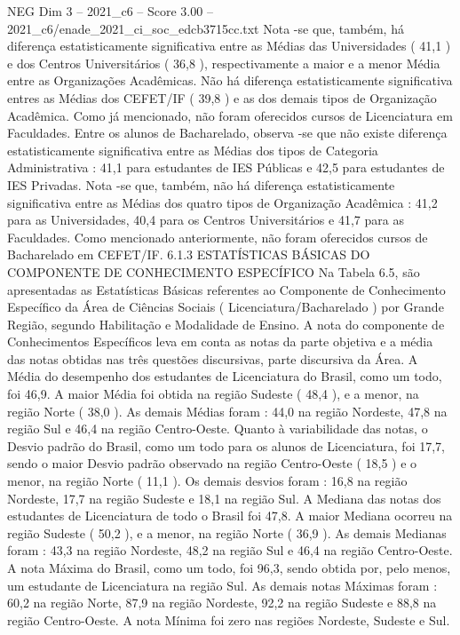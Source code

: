 \begin{textsample}{NEG Dim 3 – 2021\_c6 – Score 3.00 – 2021\_c6/enade\_2021\_ci\_soc\_edcb3715cc.txt}
Nota -se que, também, há diferença estatisticamente significativa entre as Médias das Universidades ( 41,1 ) e dos Centros Universitários ( 36,8 ), respectivamente a maior e a menor Média entre as Organizações Acadêmicas.
Não há diferença estatisticamente significativa entres as Médias dos CEFET/IF ( 39,8 ) e as dos demais tipos de Organização Acadêmica.
Como já mencionado, não foram oferecidos cursos de Licenciatura em Faculdades.
Entre os alunos de Bacharelado, observa -se que não existe diferença estatisticamente significativa entre as Médias dos tipos de Categoria Administrativa : 41,1 para estudantes de IES Públicas e 42,5 para estudantes de IES Privadas.
Nota -se que, também, não há diferença estatisticamente significativa entre as Médias dos quatro tipos de Organização Acadêmica : 41,2 para as Universidades, 40,4 para os Centros Universitários e 41,7 para as Faculdades.
Como mencionado anteriormente, não foram oferecidos cursos de Bacharelado em CEFET/IF. 6.1.3 ESTATÍSTICAS BÁSICAS DO COMPONENTE DE CONHECIMENTO ESPECÍFICO Na Tabela 6.5, são apresentadas as Estatísticas Básicas referentes ao Componente de Conhecimento Específico da Área de Ciências Sociais ( Licenciatura/Bacharelado ) por Grande Região, segundo Habilitação e Modalidade de Ensino.
A nota do componente de Conhecimentos Específicos leva em conta as notas da parte objetiva e a média das notas obtidas nas três questões discursivas, parte discursiva da Área.
A Média do desempenho dos estudantes de Licenciatura do Brasil, como um todo, foi 46,9.
A maior Média foi obtida na região Sudeste ( 48,4 ), e a menor, na região Norte ( 38,0 ).
As demais Médias foram : 44,0 na região Nordeste, 47,8 na região Sul e 46,4 na região Centro-Oeste.
Quanto à variabilidade das notas, o Desvio padrão do Brasil, como um todo para os alunos de Licenciatura, foi 17,7, sendo o maior Desvio padrão observado na região Centro-Oeste ( 18,5 ) e o menor, na região Norte ( 11,1 ).
Os demais desvios foram : 16,8 na região Nordeste, 17,7 na região Sudeste e 18,1 na região Sul.
A Mediana das notas dos estudantes de Licenciatura de todo o Brasil foi 47,8.
A maior Mediana ocorreu na região Sudeste ( 50,2 ), e a menor, na região Norte ( 36,9 ).
As demais Medianas foram : 43,3 na região Nordeste, 48,2 na região Sul e 46,4 na região Centro-Oeste.
A nota Máxima do Brasil, como um todo, foi 96,3, sendo obtida por, pelo menos, um estudante de Licenciatura na região Sul.
As demais notas Máximas foram : 60,2 na região Norte, 87,9 na região Nordeste, 92,2 na região Sudeste e 88,8 na região Centro-Oeste.
A nota Mínima foi zero nas regiões Nordeste, Sudeste e Sul.

\end{textsample}
